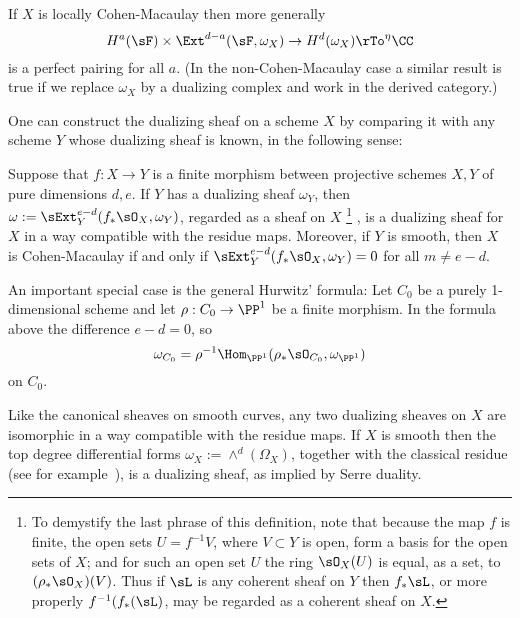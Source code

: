 \begin{fact}
If $X$ is locally Cohen-Macaulay then more generally
$$
H^a(\sF) \times \Ext^{d-a}(\sF, \omega_X) \to H^d(\omega_X) \rTo^\eta \CC
$$
is a perfect pairing for all $a$. (In the non-Cohen-Macaulay case a similar result is true if we replace $\omega_X$ by a dualizing complex
and work in the derived category.) 
\end{fact}

One can construct the dualizing sheaf on a scheme
$X$ by comparing it with any scheme $Y$ whose dualizing sheaf is known, in the following sense:
\begin{fact} \label{construction of dualizing sheaf}\label{omega}\label{general adjunction}
Suppose that $f: X\to Y$ is a finite morphism between projective schemes $X,Y$ of pure dimensions $d,e$. If $Y$ has a dualizing sheaf $\omega_Y$,
then $\omega := \sExt_Y^{e-d}(f_*\sO_X,  \omega_Y)$, regarded as a sheaf on $X$
\footnote{To demystify the last phrase of this definition, note that because the map
$f$ is finite,  the open sets $U = f^{-1}V$, where $V\subset Y$ is open, form a basis for the open sets of $X$; and for
such an open set $U$ the ring $\sO_X(U)$ is equal, as a set, to 
$(\rho_*\sO_X)(V)$. Thus if $\sL$ is any coherent sheaf on $Y$ then $f_*\sL$, or more properly $f^{-1}(f_*(\sL)$,
may be regarded as a coherent sheaf on $X$.
}
, is a dualizing sheaf for $X$ in a way compatible with the residue maps.
Moreover, if $Y$ is smooth, then $X$ is Cohen-Macaulay if and only if $ \sExt_Y^{e-d}(f_*\sO_X,  \omega_Y)= 0$ for all $m\neq e-d$.

\begin{example}\label{canonical as Hom}
An important special case is the general Hurwitz' formula:
Let $C_0$ be a purely 1-dimensional scheme and let $\rho: C_0\to \PP^1$ be a finite morphism. In the formula above the difference $e-d=0$, so 
$$
\omega_{C_0} = \rho^{-1}\Hom_{\PP^1}(\rho_*\sO_{C_0}, \omega_{\PP^1})
$$
 on $C_0.$
\end{example}

\end{fact}

Like the canonical sheaves on smooth curves, any two dualizing sheaves on  $X$ are isomorphic in a way compatible with the
residue maps. If $X$ is smooth then the top degree differential forms $\omega_X :=\wedge^d(\Omega_X)$,
together with the classical residue (see for example~\cite[p. 648, 708]{Griffiths-Harris1978}), is a dualizing sheaf, as implied by Serre duality. 

